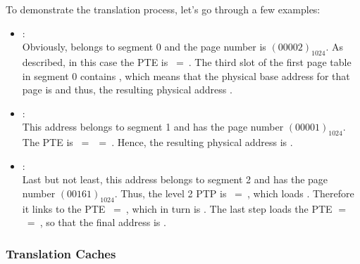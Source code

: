 To demonstrate the translation process, let's go through a few examples:
\begin{itemize}
	\item {}:\\
	Obviously,  belongs to segment 0 and the page number is $(00002)_{1024}$. As described, in this case the PTE is $~=~$. The third slot of the first page table in segment 0 contains , which means that the physical base address for that page is  and thus, the resulting physical address .
	\item {}:\\
	This address belongs to segment 1 and has the page number $(00001)_{1024}$. The PTE is $~=~$$~=~$. Hence, the resulting physical address is .
	\item {}:\\
	Last but not least, this address belongs to segment 2 and has the page number $(00161)_{1024}$. Thus, the level 2 PTP is $~=~$, which loads . Therefore it links to the PTE $~=~$, which in turn is . The last step loads the PTE  $=~$$~=~$, so that the final address is .
\end{itemize}

\subsubsection{Translation Caches}

